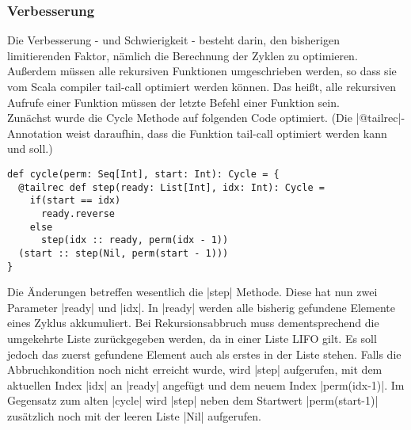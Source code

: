 \subsubsection{Verbesserung}
\label{fast_cycler}
Die Verbesserung - und Schwierigkeit - besteht darin, den bisherigen limitierenden Faktor, nämlich die Berechnung der Zyklen zu optimieren.
Außerdem müssen alle rekursiven Funktionen umgeschrieben werden, so dass sie vom Scala compiler tail-call optimiert werden können.
Das heißt, alle rekursiven Aufrufe einer Funktion müssen der letzte Befehl einer Funktion sein. \\
Zunächst wurde die Cycle Methode auf folgenden Code optimiert. (Die |@tailrec|-Annotation weist daraufhin, dass die Funktion tail-call optimiert werden kann und soll.)
\begin{lstlisting}
def cycle(perm: Seq[Int], start: Int): Cycle = {
  @tailrec def step(ready: List[Int], idx: Int): Cycle =
    if(start == idx)
      ready.reverse
    else
      step(idx :: ready, perm(idx - 1))
  (start :: step(Nil, perm(start - 1)))
}
\end{lstlisting}
Die Änderungen betreffen wesentlich die |step| Methode. Diese hat nun zwei Parameter |ready| und |idx|.
In |ready| werden alle bisherig gefundene Elemente eines Zyklus akkumuliert.
Bei Rekursionsabbruch muss dementsprechend die umgekehrte Liste zurückgegeben werden, da in einer Liste LIFO gilt.
Es soll jedoch das zuerst gefundene Element auch als erstes in der Liste stehen.
Falls die Abbruchkondition noch nicht erreicht wurde, wird |step| aufgerufen, mit dem aktuellen Index |idx| an |ready| angefügt und dem neuem Index |perm(idx-1)|.
Im Gegensatz zum alten |cycle| wird |step| neben dem Startwert |perm(start-1)| zusätzlich noch mit der leeren Liste |Nil| aufgerufen.\\


